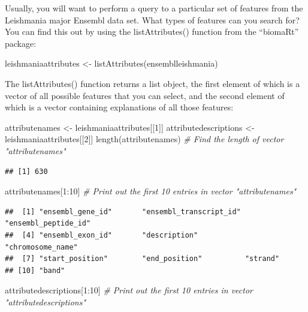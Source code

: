\documentclass[
]{book}
\newenvironment{Shaded}{\begin{snugshade}}{\end{snugshade}}
\newcommand{\CommentTok}[1]{\textcolor[rgb]{0.56,0.35,0.01}{\textit{#1}}}
\newcommand{\DecValTok}[1]{\textcolor[rgb]{0.00,0.00,0.81}{#1}}
\newcommand{\FunctionTok}[1]{\textcolor[rgb]{0.00,0.00,0.00}{#1}}
\newcommand{\NormalTok}[1]{#1}
\newcommand{\OtherTok}[1]{\textcolor[rgb]{0.56,0.35,0.01}{#1}}
\newcommand{\SpecialCharTok}[1]{\textcolor[rgb]{0.00,0.00,0.00}{#1}}
\begin{document}
Usually, you will want to perform a query to a particular set of features from the Leishmania major Ensembl data set. What types of features can you search for? You can find this out by using the listAttributes() function from the ``biomaRt'' package:

\begin{Shaded}
\begin{Highlighting}[]
\NormalTok{leishmaniaattributes }\OtherTok{\textless{}{-}} \FunctionTok{listAttributes}\NormalTok{(ensemblleishmania)}
\end{Highlighting}
\end{Shaded}

The listAttributes() function returns a list object, the first element of which is a vector of all possible features that you can select, and the second element of which is a vector containing explanations of all those features:

\begin{Shaded}
\begin{Highlighting}[]
\NormalTok{attributenames }\OtherTok{\textless{}{-}}\NormalTok{ leishmaniaattributes[[}\DecValTok{1}\NormalTok{]]}
\NormalTok{attributedescriptions }\OtherTok{\textless{}{-}}\NormalTok{ leishmaniaattributes[[}\DecValTok{2}\NormalTok{]]}
\FunctionTok{length}\NormalTok{(attributenames)        }\CommentTok{\# Find the length of vector "attributenames"}
\end{Highlighting}
\end{Shaded}

\begin{verbatim}
## [1] 630
\end{verbatim}

\begin{Shaded}
\begin{Highlighting}[]
\NormalTok{attributenames[}\DecValTok{1}\SpecialCharTok{:}\DecValTok{10}\NormalTok{]          }\CommentTok{\# Print out the first 10 entries in vector "attributenames"}
\end{Highlighting}
\end{Shaded}

\begin{verbatim}
##  [1] "ensembl_gene_id"       "ensembl_transcript_id" "ensembl_peptide_id"   
##  [4] "ensembl_exon_id"       "description"           "chromosome_name"      
##  [7] "start_position"        "end_position"          "strand"               
## [10] "band"
\end{verbatim}

\begin{Shaded}
\begin{Highlighting}[]
\NormalTok{attributedescriptions[}\DecValTok{1}\SpecialCharTok{:}\DecValTok{10}\NormalTok{]   }\CommentTok{\# Print out the first 10 entries in vector "attributedescriptions"}
\end{Highlighting}
\end{Shaded}
\end{document}
